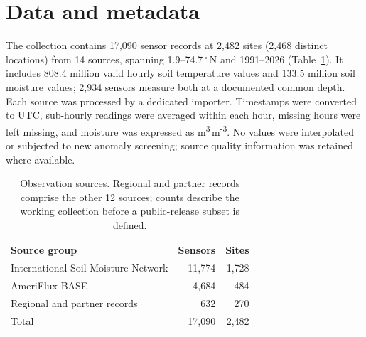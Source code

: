 \documentclass[essd,manuscript]{copernicus}
\begin{document}
\section{Data and metadata}
The collection contains 17,090 sensor records at 2,482 sites (2,468 distinct
locations) from 14 sources, spanning 1.9--74.7\,$^{\circ}$\,N and 1991--2026
(Table~\ref{tab:sources}). It includes 808.4 million valid hourly soil
temperature values and 133.5 million soil moisture values; 2,934 sensors
measure both at a documented common depth. Each source was processed by a
dedicated importer. Timestamps were converted to UTC, sub-hourly readings were
averaged within each hour, missing hours were left missing, and moisture was
expressed as m\textsuperscript{3}\,m\textsuperscript{-3}. No values were
interpolated or subjected to new anomaly screening; source quality information
was retained where available.

\begin{table}[t]
\caption{Observation sources. Regional and partner records comprise the other
12 sources; counts describe the working collection before a public-release
subset is defined.}
\label{tab:sources}
\centering
\begin{tabular}{lrr}
\hline
Source group & Sensors & Sites \\
\hline
International Soil Moisture Network & 11,774 & 1,728 \\
AmeriFlux BASE & 4,684 & 484 \\
Regional and partner records & 632 & 270 \\
\hline
Total & 17,090 & 2,482 \\
\hline
\end{tabular}
\end{table}
\end{document}
